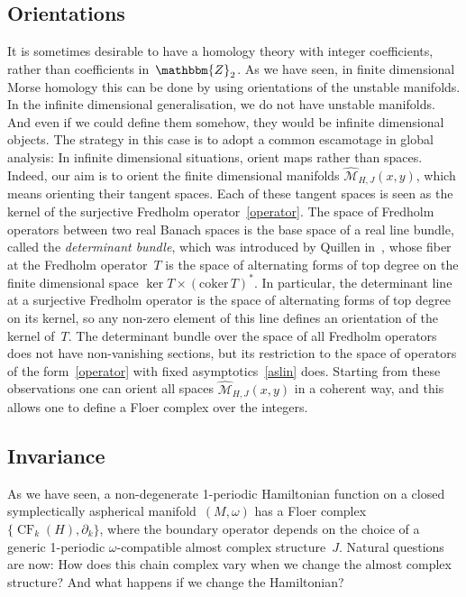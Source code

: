 \documentclass[12pt,twoside]{amsart}
\theoremstyle{plain}
\numberwithin{figure}{section}
\numberwithin{equation}{section}
\def\CF{\operatorname{CF}}
\def\ZZ{\mathbbm{Z}}
\begin{document}
\subsection{Orientations} 
It is sometimes desirable to have a homology theory with integer coefficients, rather than coefficients 
in~$\ZZ_2$. As we have seen, in finite dimensional Morse homo\-lo\-gy this can be done by using orientations of the unstable manifolds. In the infinite dimensional generalisation, we do not have unstable manifolds. 
And even if we could define them somehow, they would be infinite dimensional objects. The strategy in this case is to adopt a common escamotage in global analysis: In infinite dimensional situations, 
orient maps rather than spaces. Indeed, our aim is to orient the finite dimensional manifolds $\widehat{\mathcal{M}}_{H,J}(x,y)$, which means orienting their tangent spaces. 
Each of these tangent spaces is seen as the kernel of the surjective Fredholm operator~\eqref{operator}. 
The space of Fredholm operators between two real Banach spaces is the base space of a real line bundle, called the {\em determinant bundle}, which was introduced by Quillen in~\cite{qui85}, 
whose fiber at the Fredholm operator~$T$ is the space of alternating forms of top degree on the finite dimensional space $\ker T \times (\mathrm{coker}\, T)^*$. In particular, the determinant line at a surjective Fredholm operator is the space of alternating forms of top degree on its kernel, so any non-zero element of this line defines an orientation of the kernel of~$T$. The determinant bundle over the space of all Fredholm operators does not have non-vanishing sections, but its restriction to the space of operators 
of the form~\eqref{operator} with fixed asymptotics~\eqref{aslin} does. 
Starting from these observations one can orient all spaces $\widehat{\mathcal{M}}_{H,J}(x,y)$ 
in a coherent way, and this allows one to define a Floer complex over the integers. 

\subsection{Invariance}  
\label{s:invariance}
As we have seen, a non-degenerate 1-periodic Hamiltonian function on a closed symplectically aspherical 
manifold~$(M,\omega)$ has a Floer complex $\{\CF_k(H),\partial_k\}$, where the boundary operator depends 
on the choice of a generic 1-periodic $\omega$-compatible almost complex structure~$J$. 
Natural questions are now: How does this chain complex vary when we change the almost complex structure? 
And what happens if we change the Hamiltonian? 
\end{document}
